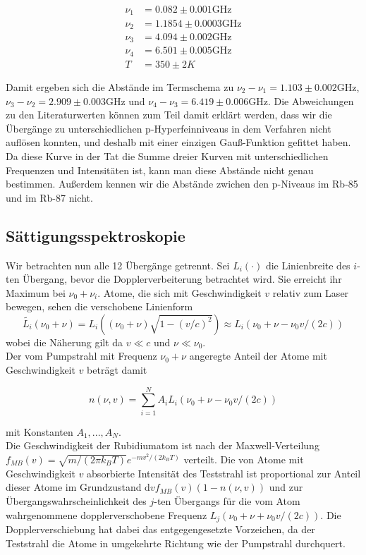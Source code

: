 \documentclass[a4paper,parskip]{scrartcl}
\begin{document}
\begin{align*}
\nu_1 &= 0.082 \pm 0.001 \mathrm{GHz} \\
\nu_2 &= 1.1854 \pm 0.0003 \mathrm{GHz}\\
\nu_3 &= 4.094 \pm 0.002 \mathrm{GHz}\\
\nu_4 &= 6.501 \pm 0.005 \mathrm{GHz}\\
T&=350 \pm 2 K
\end{align*}

Damit ergeben sich die Abstände im Termschema zu $\nu_2 - \nu_1 = 1.103 \pm 0.002$GHz,  $\nu_3 - \nu_2 = 2.909 \pm 0.003$GHz und $\nu_4 - \nu_3 = 6.419 \pm 0.006$GHz. Die Abweichungen zu den Literaturwerten können zum Teil damit erklärt werden, dass wir die Übergänge zu unterschiedlichen p-Hyperfeinniveaus in dem Verfahren nicht auflösen konnten, und deshalb mit einer einzigen Gauß-Funktion gefittet haben. Da diese Kurve in der Tat die Summe dreier Kurven mit unterschiedlichen Frequenzen und Intensitäten ist, kann man diese Abstände nicht genau bestimmen. Außerdem kennen wir die Abstände zwichen den p-Niveaus im Rb-85 und im Rb-87 nicht.

\subsection{Sättigungsspektroskopie}

Wir betrachten nun alle 12 Übergänge getrennt. Sei $L_i(\cdot )$ die Linienbreite des $i$-ten Übergang, bevor die Dopplerverbeiterung betrachtet wird. Sie erreicht ihr Maximum bei $\nu_0+\nu_i$. Atome, die sich mit Geschwindigkeit $v$ relativ zum Laser bewegen, sehen die verschobene Linienform
$$\tilde{L_i}(\nu_0+\nu) = L_i((\nu_0+\nu)\sqrt{1-(v/c)^2}) \approx L_i(\nu_0+\nu-\nu_0 v/(2c))$$
wobei die Näherung gilt da $v \ll c$ und $\nu \ll \nu_0$.\\
  Der vom Pumpstrahl mit Frequenz $\nu_0+\nu$ angeregte Anteil der Atome mit Geschwindigkeit $v$ beträgt damit

$$n(\nu, v) = \sum_{i=1}^N A_i L_i(\nu_0+\nu-\nu_0 v/(2c))$$

mit Konstanten $A_1, ..., A_N$.\\

Die Geschwindigkeit der Rubidiumatom ist nach der Maxwell-Verteilung $f_{MB}(v) = \sqrt{m/(2\pi k_B T)} e^{-mv^2/(2k_BT)}$ verteilt. Die von Atome mit Geschwindigkeit $v$ absorbierte Intensität des Teststrahl ist proportional zur Anteil dieser Atome im Grundzustand $\mathrm{d}v f_{MB}(v)(1-n(\nu, v))$ und zur Übergangswahrscheinlichkeit des $j$-ten Übergangs für die vom Atom wahrgenommene dopplerverschobene Frequenz $L_j(\nu_0+\nu+\nu_0 v/(2c))$. Die Dopplerverschiebung hat dabei das entgegengesetzte Vorzeichen, da der Teststrahl die Atome in umgekehrte Richtung wie der Pumpstrahl durchquert.
\end{document}
